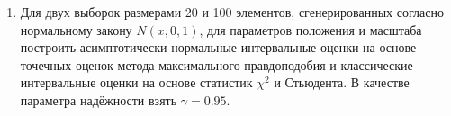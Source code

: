 \begin{enumerate}
	\item Для двух выборок размерами 20 и 100 элементов, сгенерированных согласно нормальному закону $N(x,0,1)$, для параметров положения и масштаба построить асимптотически нормальные интервальные оценки на основе точечных оценок метода максимального правдоподобия и классические интервальные оценки на основе статистик $\chi^2$ и Стьюдента. В качестве параметра надёжности взять $\gamma = 0.95$.
\end{enumerate}

\newpage
